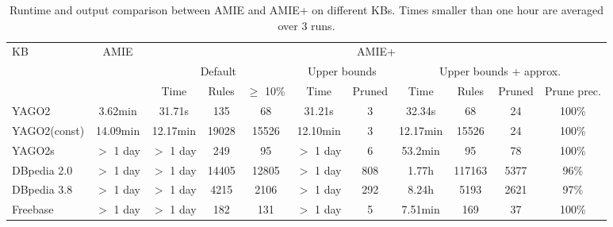 \begin{center}
\begin{savenotes}
\begin{table}[t]
\footnotesize
\begin{tabular}{|l|c|c|c|c|c|c|c|c|c|c|}
\hline
\multirow{3}{*}{KB} 	& \multirow{3}{*}{AMIE}  	& \multicolumn{9}{c|}{AMIE+} 	\\ \cline{3-11}
			&  				& \multicolumn{3}{c|}{Default}		& \multicolumn{2}{c}{Upper bounds} 	& \multicolumn{4}{|c|}{Upper bounds + approx.}\\ \cline{3-11}
			&  				& Time & Rules & $\ge$ 10\% 		& Time & Pruned 			& Time & Rules & Pruned & Prune prec. \\ \hline
YAGO2  			& 3.62min  			& 31.71s & 135 & 68 			& 31.21s & 3 				& 32.34s& 68 & 24 & 100\%\\
YAGO2(const) 		& 14.09min  			& 12.17min  & 19028 & 15526 		& 12.10min & 3 				& 12.17min & 15526 & 24 & 100\% \\
YAGO2s  		& $>$ 1 day 			& $>$ 1 day & 249 & 95  		& $>$ 1 day & 6  			& 53.2min & 95 & 78 & 100\%\\
DBpedia 2.0  		& $>$ 1 day 			& $>$ 1 day  & 14405  & 12805 		& $>$ 1 day & 808 			& 1.77h & 117163 & 5377 & 96\%\\
DBpedia 3.8  		& $>$ 1 day  			& $>$ 1 day   & 4215 & 2106  		& $>$ 1 day & 292 			& 8.24h & 5193 & 2621 & 97\%\\
Freebase 		& $>$ 1 day 			& $>$ 1 day & 182  & 131 		& $>$ 1 day & 5 			& 7.51min & 169 & 37 & 100\% \\ \hline
\end{tabular}
\caption{Runtime and output comparison between AMIE and AMIE+ on different KBs. Times smaller than one hour are averaged over 3 runs.}
\label{amievsplus}
\end{table}
\end{savenotes}
\end{center}

